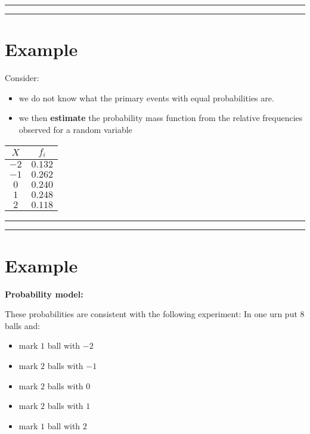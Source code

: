 \documentclass[
]{book}
\providecommand{\tightlist}{%
  \setlength{\itemsep}{0pt}\setlength{\parskip}{0pt}}
\begin{document}
\begin{center}\rule{0.5\linewidth}{0.5pt}\end{center}

\begin{center}\rule{0.5\linewidth}{0.5pt}\end{center}

\hypertarget{example-6}{%
\section{Example}\label{example-6}}

Consider:

\begin{itemize}
\tightlist
\item
  we do not know what the primary events with equal probabilities are.
\item
  we then \textbf{estimate} the probability mass function from the relative frequencies observed for a random variable
\end{itemize}

\begin{longtable}[]{@{}cc@{}}
\toprule
\(X\) & \(f_i\) \\
\midrule
\endhead
\(-2\) & \(0.132\) \\
\(-1\) & \(0.262\) \\
\(0\) & \(0.240\) \\
\(1\) & \(0.248\) \\
\(2\) & \(0.118\) \\
\bottomrule
\end{longtable}

\begin{center}\rule{0.5\linewidth}{0.5pt}\end{center}

\begin{center}\rule{0.5\linewidth}{0.5pt}\end{center}

\hypertarget{example-7}{%
\section{Example}\label{example-7}}

\textbf{Probability model:}

These probabilities are consistent with the following experiment: In one urn put \(8\) balls and:

\begin{itemize}
\tightlist
\item
  mark \(1\) ball with \(-2\)
\item
  mark \(2\) balls with \(-1\)
\item
  mark \(2\) balls with \(0\)
\item
  mark \(2\) balls with \(1\)
\item
  mark \(1\) ball with \(2\)
\end{itemize}
\end{document}
